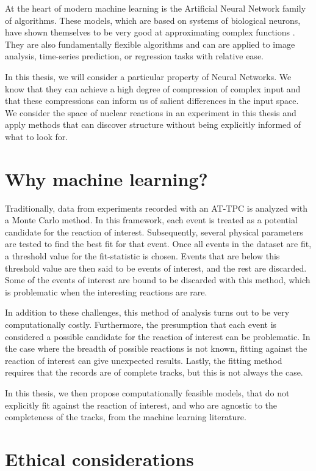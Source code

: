 At the heart of modern machine learning is the Artificial Neural Network family of algorithms. These models, which are based on systems of biological neurons, have shown themselves to be very good at approximating complex functions \cite{Lin2017}. They are also fundamentally flexible algorithms and can are applied to image analysis, time-series prediction, or regression tasks with relative ease.

In this thesis, we will consider a particular property of Neural Networks. We know that they can achieve a high degree of compression of complex input and that these compressions can inform us of salient differences in the input space. We consider the space of nuclear reactions in an experiment in this thesis and apply methods that can discover structure without being explicitly informed of what to look for.

\section{Why machine learning?}

Traditionally, data from experiments recorded with an AT-TPC is analyzed with a Monte Carlo method. In this framework, each event is treated as a potential candidate for the reaction of interest. Subsequently, several physical parameters are tested to find the best fit for that event. Once all events in the dataset are fit, a threshold value for the fit-statistic is chosen. Events that are below this threshold value are then said to be events of interest, and the rest are discarded. Some of the events of interest are bound to be discarded with this method, which is problematic when the interesting reactions are rare. 

In addition to these challenges, this method of analysis turns out to be very computationally costly. Furthermore, the presumption that each event is considered a possible candidate for the reaction of interest can be problematic. In the case where the breadth of possible reactions is not known, fitting against the reaction of interest can give unexpected results. Lastly, the fitting method requires that the records are of complete tracks, but this is not always the case.

In this thesis, we then propose computationally feasible models, that do not explicitly fit against the reaction of interest, and who are agnostic to the completeness of the tracks, from the machine learning literature.

\section{Ethical considerations}

